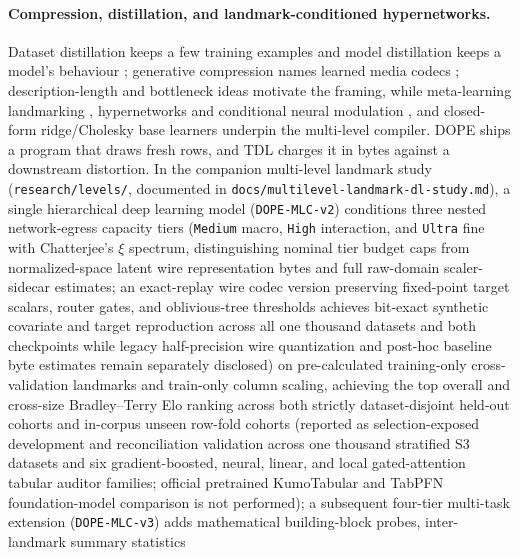 \paragraph{Compression, distillation, and landmark-conditioned hypernetworks.} Dataset distillation
keeps a few training examples and model distillation keeps a model's behaviour
\citep{wang2018distillation,hinton2015distilling}; generative compression names learned media codecs
\citep{santurkar2017generative,balle2017endtoend}; description-length and bottleneck ideas
\citep{rissanen1978modeling,blumer1987occam,tishby2000bottleneck} motivate the framing, while meta-learning
landmarking \citep{pfahringer2000landmarking,bardenet2013collaborative,feurer2015autosklearn,vanschoren2018metalearning},
hypernetworks and conditional neural modulation \citep{ha2017hypernetworks,perez2018film,garnelo2018cnp},
and closed-form ridge/Cholesky base learners \citep{ledoit2004shrinkage,bertinetto2019closedform}
underpin the multi-level compiler.
DOPE ships a program that draws fresh rows, and TDL charges it in bytes against a downstream
distortion. In the companion multi-level landmark study (\texttt{research/levels/}, documented in
\texttt{docs/multilevel-landmark-dl-study.md}), a single hierarchical deep learning model
(\texttt{DOPE-MLC-v2}) conditions three nested network-egress capacity tiers (\texttt{Medium} macro,
\texttt{High} interaction, and \texttt{Ultra} fine with Chatterjee's $\xi$ spectrum, distinguishing
nominal tier budget caps from normalized-space latent wire representation bytes and full raw-domain
scaler-sidecar estimates; an exact-replay wire codec version preserving fixed-point target scalars,
router gates, and oblivious-tree thresholds achieves bit-exact synthetic covariate and target
reproduction across all one thousand datasets and both checkpoints while legacy half-precision wire
quantization and post-hoc baseline byte estimates remain separately disclosed) on pre-calculated
training-only cross-validation landmarks and train-only column scaling, achieving the top overall and
cross-size Bradley--Terry Elo ranking across both strictly dataset-disjoint held-out cohorts and
in-corpus unseen row-fold cohorts (reported as selection-exposed development and reconciliation
validation across one thousand stratified S3 datasets and six gradient-boosted, neural, linear, and
local gated-attention tabular auditor families; official pretrained KumoTabular and TabPFN
foundation-model comparison is not performed); a subsequent four-tier multi-task extension
(\texttt{DOPE-MLC-v3}) adds mathematical building-block probes, inter-landmark summary statistics

